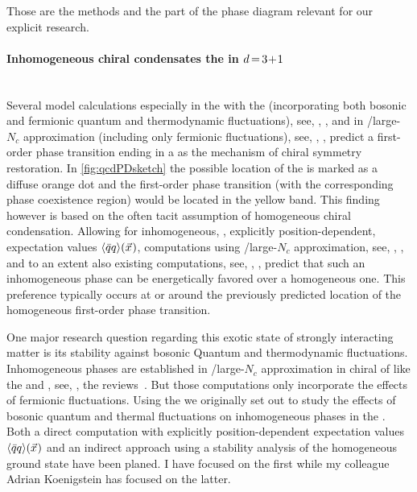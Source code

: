 Those are the methods and the part of the \qcd{} phase diagram relevant for our explicit research.

\paragraph{Inhomogeneous chiral condensates \dash{} the \qmm{} in $d\mkern-2mu=\mkern-2mu3\mkern-3mu+\mkern-3mu1$}\label{paragraph:introInhomoQMM}\mbox{}\\%
Several model calculations especially in the \fourDimensional{} \qmm{} with the \frg{} (incorporating both bosonic and fermionic quantum and thermodynamic fluctuations), see, \eg{}, , and in /large-$N_c$ approximation (including only fermionic fluctuations), see, \eg{}, , predict a first-order phase transition ending in a \cp{} as the mechanism of chiral symmetry restoration.
In \cref{fig:qcdPDsketch} the possible location of the \cp{} is marked as a diffuse orange dot and the first-order phase transition (with the corresponding phase coexistence region) would be located in the yellow band.
This finding however is based on the \dash{} often tacit \dash{} assumption of homogeneous chiral condensation.
Allowing for inhomogeneous, \ie{}, explicitly position-dependent, expectation values $\langle \bar{q} q \rangle(\vec{x}\mskip1.0mu)$, computations using \mf{}/large-$N_c$ approximation, see, \eg{}, , and to an extent also existing \frg{} computations, see, \eg{}, , predict that such an inhomogeneous phase can be energetically favored over a homogeneous one.
This preference typically occurs at or around the previously predicted location of the homogeneous first-order phase transition.

One major research question regarding this exotic state of strongly interacting matter is its stability against bosonic Quantum and thermodynamic fluctuations. 
Inhomogeneous phases are established in \mf{}/large-$N_c$ approximation in \fourDimensional{} chiral \loefts{} of \qcd{} like the \njlm{} and \qmm{}, see, \eg{}, the reviews~\cite{Broniowski:2011ef,Buballa:2014tba}. 
But those computations only incorporate the effects of fermionic fluctuations.
Using the \frg{} we originally set out to study the effects of bosonic quantum and thermal fluctuations on inhomogeneous phases in the \qmm{}.
Both a direct computation with explicitly position-dependent expectation values $\langle \bar{q} q \rangle(\vec{x}\mskip1.0mu)$ and an indirect approach using a stability analysis of the homogeneous ground state have been planed.
I have focused on the first while my colleague Adrian Koenigstein has focused on the latter.

